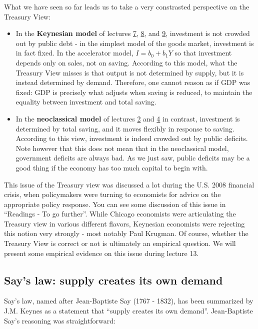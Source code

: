 \documentclass[]{book}
\theoremstyle{definition}
\theoremstyle{definition}
\theoremstyle{definition}
\theoremstyle{remark}
\begin{document}
What we have seen so far leads us to take a very constrasted perspective
on the Treasury View:

\begin{itemize}
\item
  In the \textbf{Keynesian model} of lectures
  \protect\hyperlink{cons-function}{7},
  \protect\hyperlink{paradox-thrift}{8}, and
  \protect\hyperlink{redistributive}{9}, investment is not crowded out
  by public debt - in the simplest model of the goods market, investment
  is in fact fixed. In the accelerator model, \(I=b_0 + b_1 Y\) so that
  investment depends only on sales, not on saving. According to this
  model, what the Treasury View misses is that output is not determined
  by supply, but it is instead determined by demand. Therefore, one
  cannot reason as if GDP was fixed: GDP is precisely what adjusts when
  saving is reduced, to maintain the equality between investment and
  total saving.
\item
  In the \textbf{neoclassical model} of lectures
  \protect\hyperlink{solow}{2} and \protect\hyperlink{olg}{4} in
  contrast, investment is determined by total saving, and it moves
  flexibly in response to saving. According to this view, investment is
  indeed crowded out by public deficits. Note however that this does not
  mean that in the neoclassical model, government deficits are always
  bad. As we just saw, public deficits may be a good thing if the
  economy has too much capital to begin with.
\end{itemize}

This issue of the Treasury view was discussed a lot during the U.S. 2008
financial crisis, when policymakers were turning to economists for
advice on the appropriate policy response. You can see some discussion
of this issue in ``Readings - To go further''. While Chicago economists
were articulating the Treasury view in various different flavors,
Keynesian economists were rejecting this notion very strongly - most
notably Paul Krugman. Of course, whether the Treasury View is correct or
not is ultimately an empirical question. We will present some empirical
evidence on this issue during lecture 13.

\subsection{Say's law: supply creates its own
demand}\label{says-law-supply-creates-its-own-demand}

Say's law, named after Jean-Baptiste Say (1767 - 1832), has been
summarized by J.M. Keynes as a statement that ``supply creates its own
demand''. Jean-Baptiste Say's reasoning was straightforward:
\end{document}
